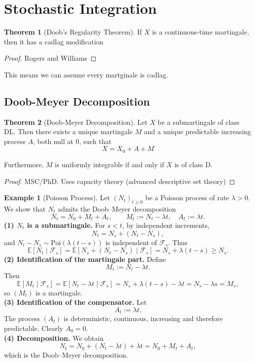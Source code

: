 \documentclass[11pt,a4paper]{article}
\theoremstyle{definition}
\newtheorem{theorem}{Theorem}[section]
\newtheorem{example}{Example}[section]
\begin{document}
\newpage

\section{Stochastic Integration}

\begin{theorem}[Doob's Regularity Theorem]
If $X$ is a continuous-time martingale, then it has a cadlag modification
\end{theorem}

\begin{proof}
Rogers and Williams
\end{proof}
This means we can assume every martginale is cadlag.

\subsection{Doob-Meyer Decomposition}

\begin{theorem}[Doob-Meyer Decomposition]\label{thm:doob_meyer}
Let $X$ be a submartingale of class DL. Then there exists a unique martingale $M$ and a unique predictable increasing process $A$, both null at $0$, such that
\[
X = X_0 + A + M
\]

Furthermore, $M$ is uniformly integrable if and only if $X$ is of class D.
\end{theorem}

\begin{proof}
MSC/PhD. Uses capacity theory (advanced descriptive set theory)
\end{proof}


\begin{example}[Poisson Process]\label{ex:poisson_dm}
Let $(N_t)_{t\ge 0}$ be a Poisson process of rate $\lambda>0$.  
We show that $N_t$ admits the Doob--Meyer decomposition
\[
    N_t = N_0 + M_t + A_t,
\qquad 
M_t := N_t - \lambda t,\quad
A_t := \lambda t.
\]
\textbf{(1) $N_t$ is a submartingale.}  
For $s<t$, by independent increments,
\[
N_t = N_s + (N_t - N_s),
\]
and $N_t - N_s \sim \mathrm{Poi}(\lambda(t-s))$ is independent of $\mathcal{F}_s$.  
Thus
\[
\mathbb{E}[N_t \mid \mathcal{F}_s]
    = \mathbb{E}[N_s + (N_t-N_s)\mid \mathcal{F}_s]
    = N_s + \lambda(t-s) \ge N_s.
\]
\textbf{(2) Identification of the martingale part.}  
Define
\[
M_t := N_t - \lambda t.
\]
Then
\[
\mathbb{E}[M_t \mid \mathcal{F}_s]
= \mathbb{E}[N_t - \lambda t \mid \mathcal{F}_s]
= N_s + \lambda(t-s) - \lambda t
= N_s - \lambda s
= M_s,
\]
so $(M_t)$ is a martingale.\\
\textbf{(3) Identification of the compensator.}  
Let
\[
A_t := \lambda t.
\]
The process $(A_t)$ is deterministic, continuous, increasing and therefore predictable.  
Clearly $A_0=0$.\\
\textbf{(4) Decomposition.}  
We obtain
\[
N_t = N_0 + (N_t-\lambda t) + \lambda t
    = N_0 + M_t + A_t,
\]
which is the Doob--Meyer decomposition.
\end{example}
\end{document}
